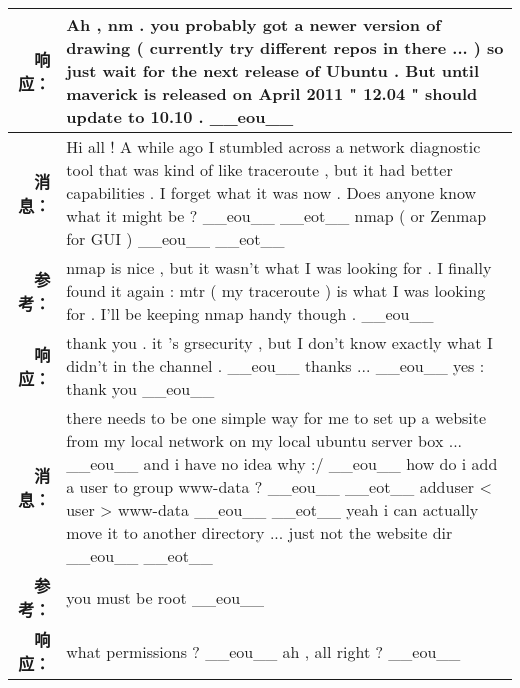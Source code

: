 \begin{tabularx}{\textwidth}{@{}rX@{}}
\textbf{响应：}&Ah , nm . you probably got a newer version of drawing ( currently try different repos in there ... ) so just wait for the next release of Ubuntu . But until maverick is released on April 2011 " 12.04 " should update to 10.10 . \_\_eou\_\_\\%
\midrule%
\textbf{消息：}&Hi all ! A while ago I stumbled across a network diagnostic tool that was kind of like traceroute , but it had better capabilities . I forget what it was now . Does anyone know what it might be ? \_\_eou\_\_ \_\_eot\_\_ nmap ( or Zenmap for GUI ) \_\_eou\_\_ \_\_eot\_\_\\%
\textbf{参考：}&nmap is nice , but it wasn't what I was looking for . I finally found it again : mtr ( my traceroute ) is what I was looking for . I'll be keeping nmap handy though . \_\_eou\_\_\\%
\textbf{响应：}&thank you . it 's grsecurity , but I don't know exactly what I didn't in the channel . \_\_eou\_\_ thanks ... \_\_eou\_\_ yes : thank you \_\_eou\_\_\\%
\midrule%
\textbf{消息：}&there needs to be one simple way for me to set up a website from my local network on my local ubuntu server box ... \_\_eou\_\_ and i have no idea why :/ \_\_eou\_\_ how do i add a user to group www{-}data ? \_\_eou\_\_ \_\_eot\_\_ adduser < user > www{-}data \_\_eou\_\_ \_\_eot\_\_ yeah i can actually move it to another directory ... just not the website dir \_\_eou\_\_ \_\_eot\_\_\\%
\textbf{参考：}&you must be root \_\_eou\_\_\\%
\textbf{响应：}&what permissions ? \_\_eou\_\_ ah , all right ? \_\_eou\_\_\\%
\midrule\bottomrule%
%
\end{tabularx}